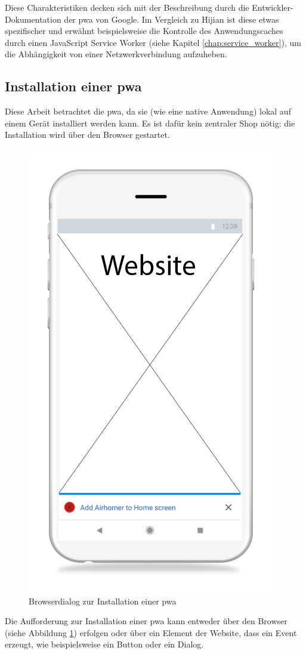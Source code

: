 \cite[S. 1f.]{Hajian2019}
Diese Charakteristiken decken sich mit der Beschreibung durch die Entwickler-Dokumentation der \ac{pwa} von Google. Im Vergleich zu Hijian ist diese etwas spezifischer und erwähnt beispielsweise die Kontrolle des Anwendungscaches durch einen JavaScript Service Worker (siehe Kapitel \ref{chap:service_worker}), um die Abhängigkeit von einer Netzwerkverbindung aufzuheben.
\cite{GooglePWAOverview}

\subsection{Installation einer \acf{pwa}}

Diese Arbeit betrachtet die \ac{pwa}, da sie (wie eine native Anwendung) lokal auf einem Gerät installiert werden kann. Es ist dafür kein zentraler Shop nötig: die Installation wird über den Browser gestartet.

\begin{figure}[h!]
        \centering
        \includegraphics[width=0.5\linewidth]{img/Wireframe_install_pwa.png}
        \caption{Browserdialog zur Installation einer \ac{pwa} \cite{PWAAddToHomeScreenPrompt}}
        \label{fig:pwainstallationprompt}
\end{figure}

Die Aufforderung zur Installation einer \ac{pwa} kann entweder über den Browser (siehe Abbildung \ref{fig:pwainstallationprompt}) erfolgen oder über ein Element der Website, dass ein Event erzeugt, wie beispielsweise ein Button oder ein Dialog. 

